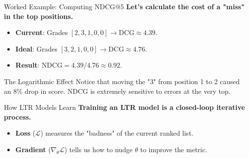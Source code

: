 \documentclass[aspectratio=169]{beamer}
\newif\ifanimated
\newcommand{\cpause}{\ifanimated\pause\fi}
\begin{document}
\begin{frame}{Worked Example: Computing NDCG@5}
\textbf{Let's calculate the cost of a "miss" in the top positions.}

\vspace{0.8em}
\begin{itemize}
    \item \textbf{Current}: Grades $[2, 3, 1, 0, 0] \to \text{DCG} \approx 4.39$.
    \item \textbf{Ideal}: Grades $[3, 2, 1, 0, 0] \to \text{DCG} \approx 4.76$.
    \item \textbf{Result}: $\text{NDCG} = 4.39 / 4.76 \approx \mathbf{0.92}$.
\end{itemize}

\vspace{1em}
\cpause
\begin{exampleblock}{The Logarithmic Effect}
Notice that moving the "3" from position 1 to 2 caused an 8\% drop in score. NDCG is extremely sensitive to errors at the very top.
\end{exampleblock}
\end{frame}


\begin{frame}{How LTR Models Learn}
\textbf{Training an LTR model is a closed-loop iterative process.}

\vspace{0.8em}
\begin{center}
\resizebox{0.9\textwidth}{!}{

}
\end{center}

\vspace{0.8em}
\begin{itemize}
    \item \textbf{Loss} ($\mathcal{L}$) measures the "badness" of the current ranked list.
    \item \textbf{Gradient} ($\nabla_\theta \mathcal{L}$) tells us how to nudge $\theta$ to improve the metric.
\end{itemize}
\end{frame}
\end{document}
